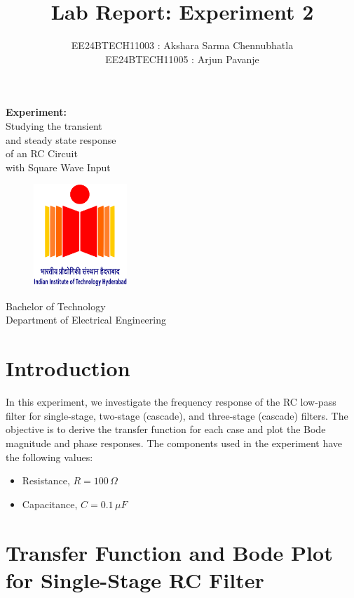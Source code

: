 \documentclass[a4paper,12pt]{article}
\title{\textbf{Lab Report: Experiment 2}}
\author{EE24BTECH11003 : Akshara Sarma Chennubhatla\\EE24BTECH11005 : Arjun Pavanje}
\begin{document}
\maketitle
\begin{center}
	\textbf{Experiment:}\\Studying the transient\\and steady state response\\of an RC Circuit\\with Square Wave Input
\end{center}
\vspace{30pt}
\begin{figure}[h!]
	\centering
	\includegraphics[width = 100pt]{.logo/logo.png}\\
\end{figure}
\begin{center}
	Bachelor of Technology\\
	\vspace{10pt}
	Department of Electrical Engineering\\
\end{center}
\newpage

\section{Introduction}
In this experiment, we investigate the frequency response of the RC low-pass filter for single-stage, two-stage (cascade), and three-stage (cascade) filters. The objective is to derive the transfer function for each case and plot the Bode magnitude and phase responses. The components used in the experiment have the following values:
\begin{itemize}
    \item Resistance, $ R = 100 \, \Omega $
    \item Capacitance, $ C = 0.1 \, \mu F $
\end{itemize}

\section{Transfer Function and Bode Plot for Single-Stage RC Filter}
\end{document}
